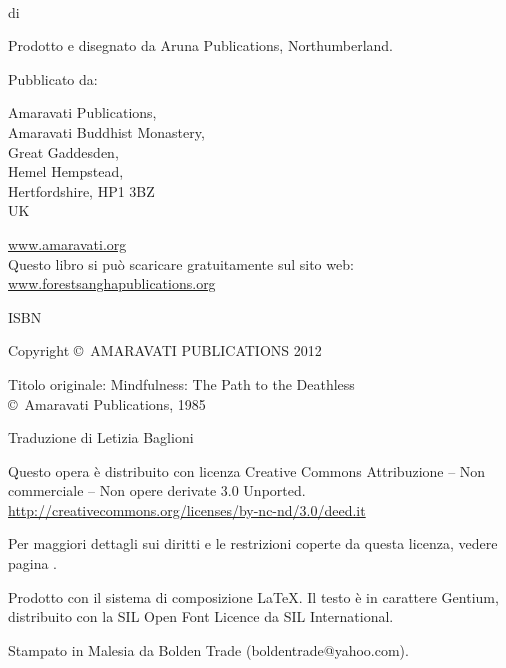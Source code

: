 {\small\setlength{\parskip}{0.8em}\setlength{\parindent}{0em}%
{\raggedright%

\thetitle\\
di \theauthor

Prodotto e disegnato da Aruna Publications, Northumberland.

Pubblicato da:

Amaravati Publications,\\
Amaravati Buddhist Monastery,\\
Great Gaddesden, \\
Hemel Hempstead, \\
Hertfordshire, HP1 3BZ\\
UK

\href{http://amaravati.org}{www.amaravati.org}\\

Questo libro si può scaricare gratuitamente sul sito web:\\
\href{http://forestsanghapublications.org/}{www.forestsanghapublications.org}

ISBN \theISBN

Copyright \copyright\ AMARAVATI PUBLICATIONS 2012


Titolo originale: Mindfulness: The Path to the Deathless\\
\copyright\ Amaravati Publications, 1985

Traduzione di Letizia Baglioni


\vfill

{\footnotesize

Questo opera è distribuito con licenza Creative Commons Attribuzione – Non commerciale – Non opere derivate 3.0 Unported.\\
\href{http://creativecommons.org/licenses/by-nc-nd/3.0/deed.it}{http://creativecommons.org/licenses/by-nc-nd/3.0/deed.it}

Per maggiori dettagli sui diritti e le restrizioni coperte da questa licenza, vedere pagina \pageref{copyright-details}.

Prodotto con il sistema di composizione {\selectfont\LaTeX}. Il testo è in carattere Gentium, distribuito con la SIL Open Font Licence da SIL International.

\theEditionInfo

Stampato in Malesia da Bolden Trade (boldentrade@yahoo.com).

}

}}

